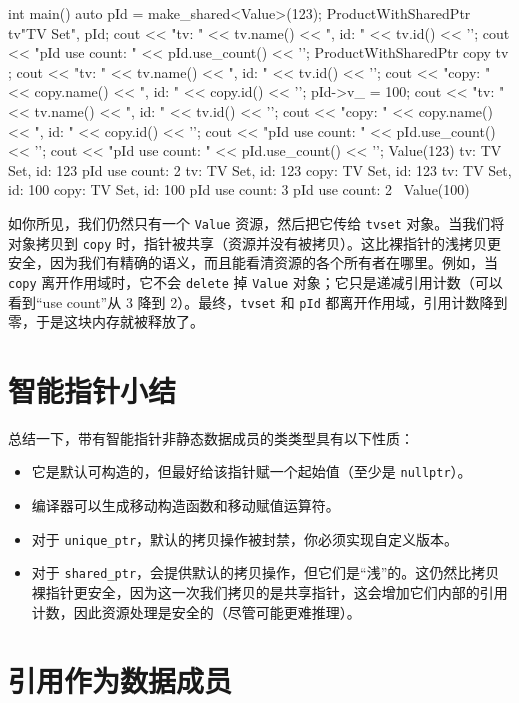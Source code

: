 \begin{codebox}[cpp]
int main() {
auto pId = make_shared<Value>(123);
ProductWithSharedPtr tv{"TV Set", pId};
cout << "tv: " << tv.name() << ", id: " << tv.id() << '\n';
cout << "pId use count: " << pId.use_count() << '\n';
{
ProductWithSharedPtr copy { tv };
cout << "tv: " << tv.name() << ", id: " << tv.id() << '\n';
cout << "copy:
" << copy.name() << ", id: " << copy.id() << '\n';
pId->v_ = 100;
cout << "tv: " << tv.name() << ", id: " << tv.id() << '\n';
cout << "copy:
" << copy.name() << ", id: " << copy.id() << '\n';
cout << "pId use count: " << pId.use_count() << '\n';
}
cout << "pId use count: " << pId.use_count() << '\n';
}
Value(123)
tv: TV Set, id: 123
pId use count: 2
tv: TV Set, id: 123
copy:
TV Set, id: 123
tv: TV Set, id: 100
copy:
TV Set, id: 100
pId use count: 3
pId use count: 2
~Value(100)
\end{codebox}

如你所见，我们仍然只有一个 \texttt{Value} 资源，然后把它传给 \texttt{tvset} 对象。当我们将对象拷贝到 \texttt{copy} 时，指针被共享（资源并没有被拷贝）。这比裸指针的浅拷贝更安全，因为我们有精确的语义，而且能看清资源的各个所有者在哪里。例如，当 \texttt{copy} 离开作用域时，它不会 \texttt{delete} 掉 \texttt{Value} 对象；它只是递减引用计数（可以看到“use count”从 3 降到 2）。最终，\texttt{tvset} 和 \texttt{pId} 都离开作用域，引用计数降到零，于是这块内存就被释放了。

\section{智能指针小结}

总结一下，带有智能指针非静态数据成员的类类型具有以下性质：

\begin{itemize}
\item 它是默认可构造的，但最好给该指针赋一个起始值（至少是 \texttt{nullptr}）。
\item 编译器可以生成移动构造函数和移动赋值运算符。
\item 对于 \texttt{unique\_ptr}，默认的拷贝操作被封禁，你必须实现自定义版本。
\item 对于 \texttt{shared\_ptr}，会提供默认的拷贝操作，但它们是“浅”的。这仍然比拷贝裸指针更安全，因为这一次我们拷贝的是共享指针，这会增加它们内部的引用计数，因此资源处理是安全的（尽管可能更难推理）。
\end{itemize}

\section{引用作为数据成员}

